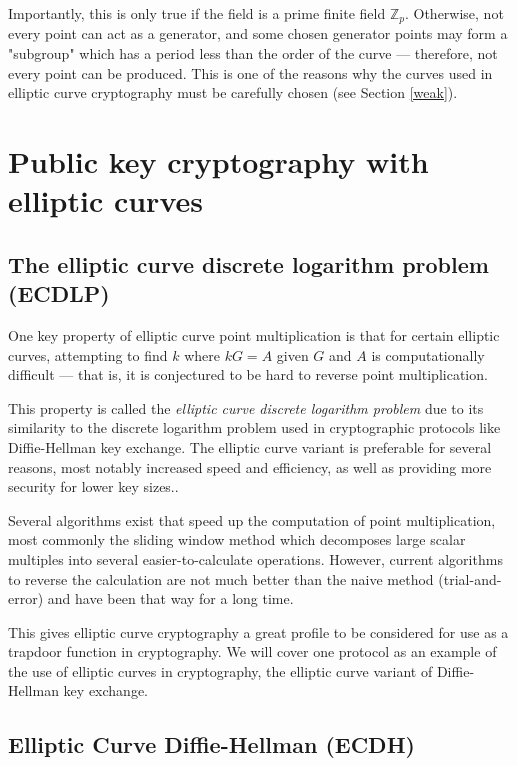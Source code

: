\documentclass[a4paper]{article}
\begin{document}
Importantly, this is only true if the field is a prime finite field $\mathbb{Z}_p$. Otherwise, not every point can act as a generator, and some chosen generator points may form a "subgroup" which has a period less than the order of the curve --- therefore, not every point can be produced.\cite{practical} This is one of the reasons why the curves used in elliptic curve cryptography must be carefully chosen (see Section \ref{weak}).


\section{Public key cryptography with elliptic curves}

\subsection{The elliptic curve discrete logarithm problem (ECDLP)}\label{ecdlp}

One key property of elliptic curve point multiplication is that for certain elliptic curves, attempting to find $k$ where $kG = A$ given $G$ and $A$ is computationally difficult --- that is, it is conjectured to be hard to reverse point multiplication.\cite{practical}

This property is called the \textit{elliptic curve discrete logarithm problem} due to its similarity to the discrete logarithm problem used in cryptographic protocols like Diffie-Hellman key exchange.\cite{discrete} The elliptic curve variant is preferable for several reasons, most notably increased speed and efficiency,\cite{nist2} as well as providing more security for lower key sizes.\cite{nist}.

Several algorithms exist that speed up the computation of point multiplication, most commonly the sliding window method which decomposes large scalar multiples into several easier-to-calculate operations. However, current algorithms to reverse the calculation are not much better than the naive method (trial-and-error)\cite{guide} and have been that way for a long time. 

This gives elliptic curve cryptography a great profile to be considered for use as a trapdoor function in cryptography.\cite{nist} We will cover one protocol as an example of the use of elliptic curves in cryptography, the elliptic curve variant of Diffie-Hellman key exchange.

\subsection{Elliptic Curve Diffie-Hellman (ECDH)}
\end{document}
